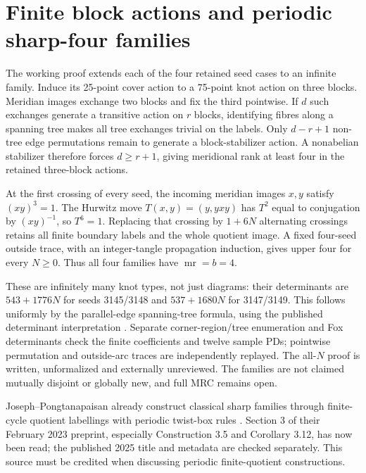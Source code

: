 \documentclass[11pt]{article}
\newcommand{\mr}{\operatorname{mr}}
\begin{document}
\section{Finite block actions and periodic sharp-four families}

The working proof  extends
each of the four retained seed cases to an infinite family.
Induce its 25-point cover action to a 75-point knot action
on three blocks. Meridian images exchange two blocks and
fix the third pointwise. If $d$ such exchanges generate a
transitive action on $r$ blocks, identifying fibres along
a spanning tree makes all tree exchanges trivial on the
labels. Only $d-r+1$ non-tree edge permutations remain to
generate a block-stabilizer action. A nonabelian stabilizer
therefore forces $d\ge r+1$, giving meridional rank at least
four in the retained three-block actions.

At the first crossing of every seed, the incoming meridian
images $x,y$ satisfy $(xy)^3=1$. The Hurwitz move
$T(x,y)=(y,yxy)$ has $T^2$ equal to conjugation by $(xy)^{-1}$,
so $T^6=1$. Replacing that crossing by $1+6N$ alternating
crossings retains all finite boundary labels and the whole
quotient image. A fixed four-seed outside trace, with an
integer-tangle propagation induction, gives upper four for
every $N\ge0$. Thus all four families have $\mr=b=4$.

These are infinitely many knot types, not just diagrams:
their determinants are $543+1776N$ for seeds 3145/3148 and
$537+1680N$ for 3147/3149. This follows uniformly by the
parallel-edge spanning-tree formula, using the published
determinant interpretation \cite[Lemma 3.14]{stoim}.
Separate corner-region/tree enumeration and Fox determinants
check the finite coefficients and twelve sample PDs;
pointwise permutation and outside-arc traces are independently
replayed. The all-$N$ proof is written, unformalized and
externally unreviewed. The families are not claimed mutually
disjoint or globally new, and full MRC remains open.

Joseph--Pongtanapaisan already construct classical sharp
families through finite-cycle quotient labellings with
periodic twist-box rules \cite{jp}. Section 3 of their
February 2023 preprint, especially Construction 3.5 and
Corollary 3.12, has now been read; the published 2025 title
and metadata are checked separately. This source must be
credited when discussing periodic finite-quotient constructions.
\end{document}
